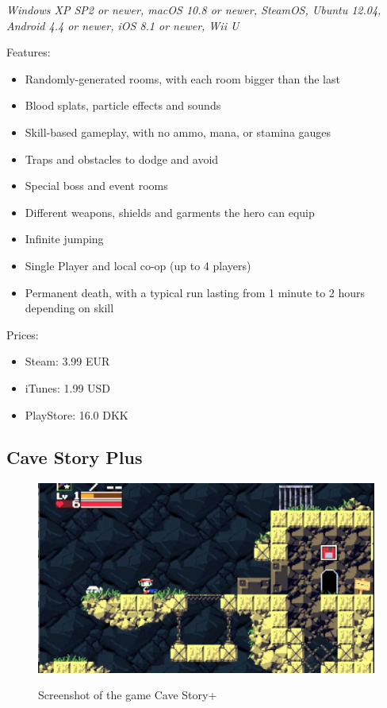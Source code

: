 \documentclass[12p]{article}
\begin{document}
\emph{Windows XP SP2 or newer, macOS 10.8 or newer, SteamOS, Ubuntu 12.04, Android 4.4 or newer, iOS 8.1 or newer, Wii U}

Features:

\begin{itemize}
  \item Randomly-generated rooms, with each room bigger than the last
  \item Blood splats, particle effects and sounds
  \item Skill-based gameplay, with no ammo, mana, or stamina gauges
  \item Traps and obstacles to dodge and avoid
  \item Special boss and event rooms
  \item Different weapons, shields and garments the hero can equip
  \item Infinite jumping
  \item Single Player and local co-op (up to 4 players)
  \item Permanent death, with a typical run lasting from 1 minute to 2 hours depending on skill
\end{itemize}

Prices:

\begin{itemize}
  \item Steam: 3.99 EUR
  \item iTunes: 1.99 USD
  \item PlayStore: 16.0 DKK
\end{itemize}


\subsection{Cave Story Plus}

\begin{figure}[ht]
  \center
  \includegraphics[width=1\textwidth]{StateOfTheArtScreenshots/cave_story_plus}
  \label{StateOfTheArt_Screenshots_CaveStoryPlus}
  \caption{Screenshot of the game Cave Story+ \cite{CaveStoryPlusScreenshot}}
\end{figure}
\end{document}

